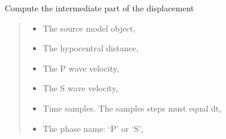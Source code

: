 \documentclass[letterpaper,10pt,english]{sphinxmanual}
\begin{document}
\begin{fulllineitems}
\begin{fulllineitems}
\begin{quote}
\begin{description}
\end{description}\end{quote}

\end{fulllineitems}


\begin{fulllineitems}
\label{\detokenize{api_lib:green_functions.BaseGreenFunction.intermediate}}
\pysigstartsignatures
{}
\pysigstopsignatures
\sphinxAtStartPar
Compute the intermediate part of the displacement
\begin{quote}\begin{description}
\begin{itemize}
\item {} 
\sphinxAtStartPar
{} \textendash{} The source model object,

\item {} 
\sphinxAtStartPar
{} \textendash{} The hypocentral distance,

\item {} 
\sphinxAtStartPar
{} \textendash{} The P wave velocity,

\item {} 
\sphinxAtStartPar
{} \textendash{} The S wave velocity,

\item {} 
\sphinxAtStartPar
{} \textendash{} Time samples. The samples steps must equal dt,

\item {} 
\sphinxAtStartPar
{} \textendash{} The phase name: ‘P’ or ‘S’,

\end{itemize}


\end{description}
\end{quote}
\end{fulllineitems}
\end{fulllineitems}
\end{document}
